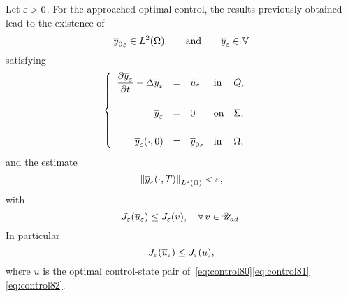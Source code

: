 Let $\varepsilon > 0$. For the approached optimal control, the results previously
obtained lead to the existence of
\begin{equation*}
    {\overline{y}_{0}}_{\varepsilon}\in L^{2}\!\left({\Omega}\right)\qquad\text{and}\qquad
    {\overline{y}}_{\varepsilon}\in\mathbb{V}
\end{equation*}
satisfying
\begin{equation}\label{eq:control89}
    \begin{cases}\displaystyle
        \begin{array}{rclll}
            \dfrac{\partial{}{\overline{y}}_{\varepsilon}}{\partial{}t} - \Delta{\overline{y}}_{\varepsilon} & = & {\overline{u}}_{\varepsilon} &
            \text{in} & Q,\\
            \\
            {\overline{y}}_{\varepsilon} & = & 0 & \text{on} & \Sigma,\\
            \\
            {{\overline{y}}_{\varepsilon}}\!\left({\cdot, 0}\right) & = & {\overline{y}_{0}}_{\varepsilon} &
            \text{in} & \Omega,
        \end{array}
    \end{cases}
\end{equation}
and the estimate
\begin{equation*}
    {\left\|{ { {\overline{y}}_{\varepsilon} }\!\left({\cdot,T}\right)   }\right\|}_{L^{2}\left({\Omega}\right)} < \varepsilon,
\end{equation*}
with
\begin{equation*}
    J_{\varepsilon}\!\left({{\overline{u}}_{\varepsilon}}\right)\leq J_{\varepsilon}(v),\quad
    \forall\,v\in{\mathscr{U}}_{ad}.
\end{equation*}
In particular
\begin{equation}\label{eq:control92}
    J_{\varepsilon}\!\left({{\overline{u}}_{\varepsilon}}\right) \leq J_{\varepsilon}(u),
\end{equation}
where $u$ is the optimal control-state pair
of~\eqref{eq:control80}\eqref{eq:control81}\eqref{eq:control82}.

